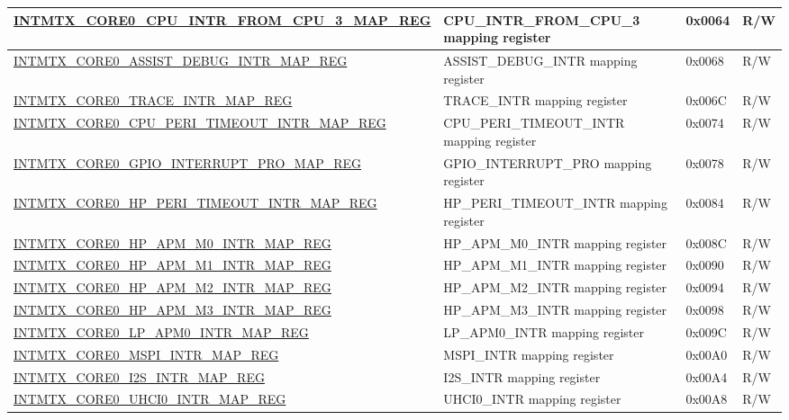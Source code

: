 \begin{longtable}{ | p{10cm} | p{10cm} | p{1.3cm} | p{1cm} | }
\hyperref[regdesc:INTMTXCORE0CPUINTRFROMCPU3MAPREG]{INTMTX\_CORE0\_CPU\_INTR\_FROM\_CPU\_3\_MAP\_REG} & CPU\_INTR\_FROM\_CPU\_3 mapping register & 0x0064 & R/W \\ \hline
\hyperref[regdesc:INTMTXCORE0ASSISTDEBUGINTRMAPREG]{INTMTX\_CORE0\_ASSIST\_DEBUG\_INTR\_MAP\_REG} & ASSIST\_DEBUG\_INTR mapping register & 0x0068 & R/W \\ \hline
\hyperref[regdesc:INTMTXCORE0TRACEINTRMAPREG]{INTMTX\_CORE0\_TRACE\_INTR\_MAP\_REG} & TRACE\_INTR mapping register & 0x006C & R/W \\ \hline
\hyperref[regdesc:INTMTXCORE0CPUPERITIMEOUTINTRMAPREG]{INTMTX\_CORE0\_CPU\_PERI\_TIMEOUT\_INTR\_MAP\_REG} & CPU\_PERI\_TIMEOUT\_INTR mapping register & 0x0074 & R/W \\ \hline
\hyperref[regdesc:INTMTXCORE0GPIOINTERRUPTPROMAPREG]{INTMTX\_CORE0\_GPIO\_INTERRUPT\_PRO\_MAP\_REG} & GPIO\_INTERRUPT\_PRO mapping register & 0x0078 & R/W \\ \hline
\hyperref[regdesc:INTMTXCORE0HPPERITIMEOUTINTRMAPREG]{INTMTX\_CORE0\_HP\_PERI\_TIMEOUT\_INTR\_MAP\_REG} & HP\_PERI\_TIMEOUT\_INTR mapping register & 0x0084 & R/W \\ \hline
\hyperref[regdesc:INTMTXCORE0HPAPMM0INTRMAPREG]{INTMTX\_CORE0\_HP\_APM\_M0\_INTR\_MAP\_REG} & HP\_APM\_M0\_INTR mapping register & 0x008C & R/W \\ \hline
\hyperref[regdesc:INTMTXCORE0HPAPMM1INTRMAPREG]{INTMTX\_CORE0\_HP\_APM\_M1\_INTR\_MAP\_REG} & HP\_APM\_M1\_INTR mapping register & 0x0090 & R/W \\ \hline
\hyperref[regdesc:INTMTXCORE0HPAPMM2INTRMAPREG]{INTMTX\_CORE0\_HP\_APM\_M2\_INTR\_MAP\_REG} & HP\_APM\_M2\_INTR mapping register & 0x0094 & R/W \\ \hline
\hyperref[regdesc:INTMTXCORE0HPAPMM3INTRMAPREG]{INTMTX\_CORE0\_HP\_APM\_M3\_INTR\_MAP\_REG} & HP\_APM\_M3\_INTR mapping register & 0x0098 & R/W \\ \hline
\hyperref[regdesc:INTMTXCORE0LPAPM0INTRMAPREG]{INTMTX\_CORE0\_LP\_APM0\_INTR\_MAP\_REG} & LP\_APM0\_INTR mapping register & 0x009C & R/W \\ \hline
\hyperref[regdesc:INTMTXCORE0MSPIINTRMAPREG]{INTMTX\_CORE0\_MSPI\_INTR\_MAP\_REG} & MSPI\_INTR mapping register & 0x00A0 & R/W \\ \hline
\hyperref[regdesc:INTMTXCORE0I2SINTRMAPREG]{INTMTX\_CORE0\_I2S\_INTR\_MAP\_REG} & I2S\_INTR mapping register & 0x00A4 & R/W \\ \hline
\hyperref[regdesc:INTMTXCORE0UHCI0INTRMAPREG]{INTMTX\_CORE0\_UHCI0\_INTR\_MAP\_REG} & UHCI0\_INTR mapping register & 0x00A8 & R/W \\ \hline

\end{longtable}
